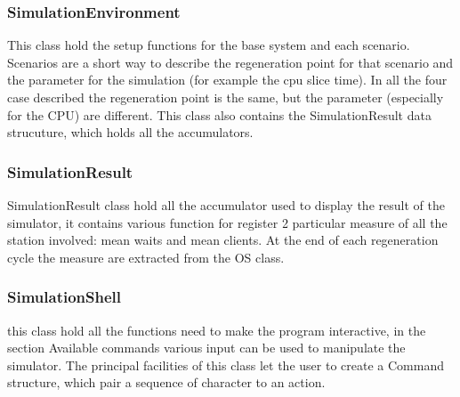 \documentclass[12pt,a4paper]{article}
\begin{document}
\subsubsection{SimulationEnvironment}
This class hold the setup functions for the base system and each scenario. Scenarios are a short way to describe the regeneration point for that scenario and the parameter for the simulation (for example the cpu slice time). In all the four case described the regeneration point is the same, but the parameter (especially for the CPU) are different. This class also contains the SimulationResult data strucuture, which holds all the accumulators.
\subsubsection{SimulationResult}
SimulationResult class hold all the accumulator used to display the result of the simulator, it contains various function for register 2 particular measure of all the station involved: mean waits and mean clients. At the end of each regeneration cycle the measure are extracted from the OS class.
\subsubsection{SimulationShell}
this class hold all the functions need to make the program interactive, in the section Available commands various input can be used to manipulate the simulator. The principal facilities of this class let the user to create a Command structure, which pair a sequence of character to an action.
\end{document}
